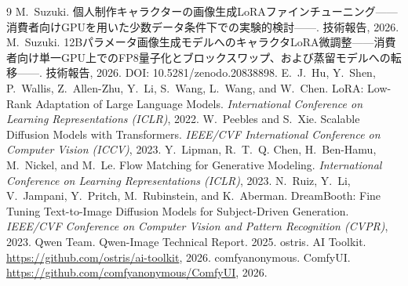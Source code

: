 \documentclass[10pt,twocolumn]{ltjsarticle}
\begin{document}
\begin{thebibliography}{9}
 M.~Suzuki. 個人制作キャラクターの画像生成LoRAファインチューニング——消費者向けGPUを用いた少数データ条件下での実験的検討——. 技術報告, 2026.
 M.~Suzuki. 12Bパラメータ画像生成モデルへのキャラクタLoRA微調整——消費者向け単一GPU上でのFP8量子化とブロックスワップ、および蒸留モデルへの転移——. 技術報告, 2026. DOI: 10.5281/zenodo.20838898.
 E.~J.~Hu, Y.~Shen, P.~Wallis, Z.~Allen-Zhu, Y.~Li, S.~Wang, L.~Wang, and W.~Chen. LoRA: Low-Rank Adaptation of Large Language Models. \textit{International Conference on Learning Representations (ICLR)}, 2022.
 W.~Peebles and S.~Xie. Scalable Diffusion Models with Transformers. \textit{IEEE/CVF International Conference on Computer Vision (ICCV)}, 2023.
 Y.~Lipman, R.~T.~Q. Chen, H.~Ben-Hamu, M.~Nickel, and M.~Le. Flow Matching for Generative Modeling. \textit{International Conference on Learning Representations (ICLR)}, 2023.
 N.~Ruiz, Y.~Li, V.~Jampani, Y.~Pritch, M.~Rubinstein, and K.~Aberman. DreamBooth: Fine Tuning Text-to-Image Diffusion Models for Subject-Driven Generation. \textit{IEEE/CVF Conference on Computer Vision and Pattern Recognition (CVPR)}, 2023.
 Qwen Team. Qwen-Image Technical Report. 2025.
 ostris. AI Toolkit. \url{https://github.com/ostris/ai-toolkit}, 2026.
 comfyanonymous. ComfyUI. \url{https://github.com/comfyanonymous/ComfyUI}, 2026.
\end{thebibliography}
\end{document}
